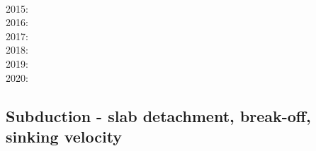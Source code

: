 {      \cite{gagd14}\cite{voge14}\cite{voge14b}\cite{lidr14}\cite{bocj04}\cite{bagb14}\cite{stjm14}
      \cite{basc14}\cite{vamd14}\cite{kile14}\cite{jahm14}\cite{bufa14}\cite{bufy14b}\cite{chsv14}
      \cite{chsg14}\cite{sigb14}\cite{shjm14}\cite{mova14}\cite{olpr14}\cite{paml14b}\cite{mafv14}\\
2015: \cite{bemm15}\cite{bomv15}\cite{bogf15}\cite{ceag15}\cite{kifr15}\cite{vami15}\cite{dali15}
      \cite{mami15}\cite{rula15}\cite{chsd15}\cite{dusc15}\cite{yotr15}\cite{cibi15}\cite{hobb15}
      \cite{carr15}\\
2016: \cite{tomy16}\cite{gukt16}\cite{robn16}\cite{mavm16}\cite{magc16}\cite{marl16}\cite{mesj16}
      \cite{jada16}\cite{jada16b}\cite{liku16}\cite{chss16}\\
2017: \cite{kicf17}\cite{sche17}\cite{pest17}\cite{vomc17}\cite{majf17}\cite{yabr17}\cite{shwl17}
      \cite{hobe17}\\
2018: \cite{yamz18}\cite{crli18}\cite{spcv18}\cite{chss18}\cite{yagz18}\cite{mazh18}\cite{pukp18}
      \cite{masg18}\cite{biar18}\\
2019: \cite{magn19}\cite{mavb19}\cite{scvm19}\cite{cakc19}\cite{samo19}\cite{sihf19}\cite{meag19}
      \cite{vaws19}\cite{bokg19}\cite{vawg19}\cite{cibi19}\\
2020: \cite{algg20}\cite{braf20}\cite{vamg20}\cite{dawl20}
}

\subsection{Subduction - slab detachment, break-off, sinking velocity}


